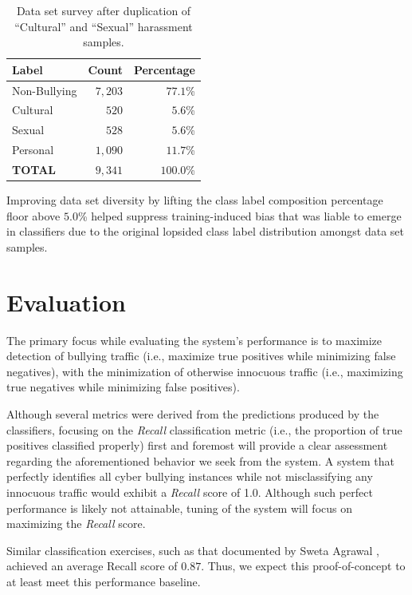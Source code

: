 \documentclass[conference]{sig-alternate-05-2015}
\begin{document}
\begin{table}[h!]
  \centering
  \begin{tabular}{| l | r | r |}
    \hline
    Label & Count & Percentage \\
    \hline\hline
    Non-Bullying & $7,203$ & $77.1$\% \\
    \hline
    Cultural & $520$ & $5.6$\% \\
    \hline
    Sexual & $528$ & $5.6$\% \\
    \hline
    Personal & $1,090$ & $11.7$\% \\
    \hline\hline
    \textbf{TOTAL} & $9,341$ & $100.0$\% \\
    \hline
  \end{tabular}
  \caption{Data set survey after duplication of ``Cultural'' and ``Sexual''
  harassment samples.}
  \label{tab:dataset_survey_final}
\end{table}

Improving data set diversity by lifting the class label composition percentage
floor above $5.0$\% helped suppress training-induced bias that was liable to
emerge in classifiers due to the original lopsided class label distribution
amongst data set samples.

\section{Evaluation}\label{sec:evaluation}

The primary focus while evaluating the system's performance is to maximize
detection of bullying traffic (i.e., maximize true positives while minimizing
false negatives), with the minimization of otherwise innocuous traffic (i.e.,
maximizing true negatives while minimizing false positives).

Although several metrics were derived from the predictions produced by the
classifiers, focusing on the \textit{Recall} classification metric
(i.e., the proportion of true positives classified properly) first and foremost
will provide a clear assessment regarding the aforementioned behavior we seek
from the system. A system that perfectly identifies all cyber bullying instances
while not misclassifying any innocuous traffic would exhibit a \textit{Recall}
score of 1.0. Although such perfect performance is likely not attainable, tuning
of the system will focus on maximizing the \textit{Recall} score.

Similar classification exercises, such as that documented by Sweta Agrawal
\cite{agrawal2018deep}, achieved an average Recall score of \( 0.87 \). Thus,
we expect this proof-of-concept to at least meet this performance baseline.
\end{document}
